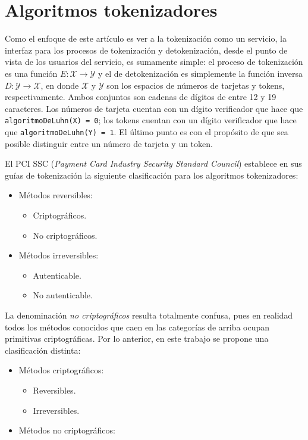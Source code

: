 %
%

\section{Algoritmos tokenizadores}

Como el enfoque de este artículo es ver a la tokenización como un servicio, la
interfaz para los procesos de tokenización y detokenización, desde el punto de
vista de los usuarios del servicio, es sumamente simple: el proceso de
tokenización es una función $ E: \mathcal{X} \rightarrow \mathcal{Y} $ y el de
detokenización es  simplemente la función inversa $ D: \mathcal{Y} \rightarrow
\mathcal{X} $, en donde $ \mathcal{X} $ y $ \mathcal{Y} $ son los espacios de
números de tarjetas y tokens, respectivamente. Ambos conjuntos son cadenas de
dígitos de entre 12 y 19 caracteres. Los números de tarjeta cuentan con un
dígito verificador que hace que \texttt{algoritmoDeLuhn(X) = 0}; los tokens
cuentan con un dígito verificador que hace que \texttt{algoritmoDeLuhn(Y) = 1}.
El último punto es con el propósito de que sea posible distinguir entre un
número de tarjeta y un token.

El PCI SSC (\textit{Payment Card Industry Security Standard Council}) establece
en sus guías de tokenización la siguiente clasificación para los algoritmos
tokenizadores\cite{pci_tokens}:


\begin{itemize}
  \item Métodos reversibles:
  \begin{itemize}
    \item Criptográficos.
    \item No criptográficos.
  \end{itemize}
  \item Métodos irreversibles:
  \begin{itemize}
    \item Autenticable.
    \item No autenticable.
  \end{itemize}
\end{itemize}

La denominación \textit{no criptográficos} resulta totalmente confusa, pues en
realidad todos los métodos conocidos que caen en las categorías de arriba ocupan
primitivas criptográficas. %
Por lo anterior, en este trabajo se propone una clasificación distinta:


\begin{itemize}
  \item Métodos criptográficos:
  \begin{itemize}
    \item Reversibles.
    \item Irreversibles.
  \end{itemize}
  \item Métodos no criptográficos:
\end{itemize}
